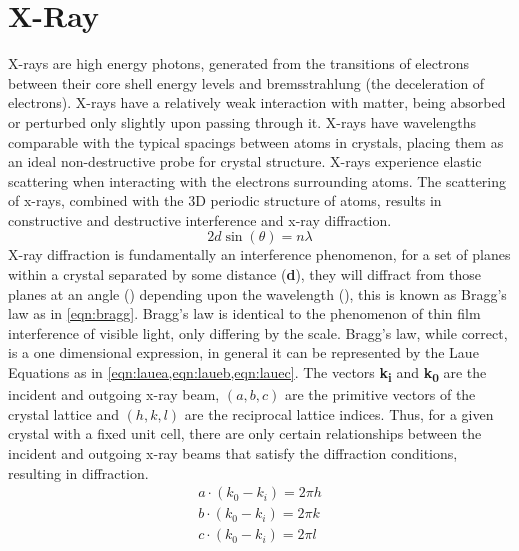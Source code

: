 \section{X-Ray}
X-rays are high energy photons, generated from the transitions of electrons between their core shell energy levels and bremsstrahlung (the deceleration of electrons). X-rays have a relatively weak interaction with matter, being absorbed or perturbed only slightly upon passing through it. X-rays have wavelengths comparable with the typical spacings between atoms in crystals, placing them as an ideal non-destructive probe for crystal structure. X-rays experience elastic scattering when interacting with the electrons surrounding atoms. The scattering of x-rays, combined with the 3D periodic structure of atoms, results in constructive and destructive interference and x-ray diffraction\cite{zavalij}.
\begin{equation}
\label{eqn:bragg} 2d \sin(\theta) = n \lambda
\end{equation}
X-ray diffraction is fundamentally an interference phenomenon, for a set of planes within a crystal separated by some distance (\textbf{d}), they will diffract from those planes at an angle (\textbf{\straighttheta}) depending upon the wavelength (\textbf{\textlambda}), this is known as Bragg's law as in \cref{eqn:bragg}. Bragg's law is identical to the phenomenon of thin film interference of visible light, only differing by the scale. Bragg's law, while correct, is a one dimensional expression, in general it can be represented by the Laue Equations as in \cref{eqn:lauea,eqn:laueb,eqn:lauec}. The vectors \textbf{k\textsubscript{i}} and \textbf{k\textsubscript{0}} are the incident and outgoing x-ray beam, $(a,b,c)$ are the primitive vectors of the crystal lattice and $(h,k,l)$ are the reciprocal lattice indices. Thus, for a given crystal with a fixed unit cell, there are only certain relationships between the incident and outgoing x-ray beams that satisfy the diffraction conditions, resulting in diffraction.
\begin{align}
   a \cdot (k_0 - k_i) = 2 \pi h \label{eqn:lauea} \\
   b \cdot (k_0 - k_i) = 2 \pi k \label{eqn:laueb} \\
   c \cdot (k_0 - k_i) = 2 \pi l \label{eqn:lauec}
\end{align}

